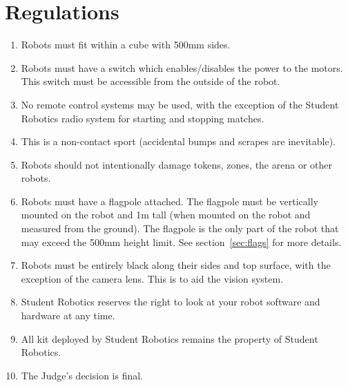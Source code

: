 \section {Regulations}
\label{regs}

\begin{enumerate}
\item Robots must fit within a cube with 500mm sides.
\item Robots must have a switch which enables/disables the power to the motors.  This switch must be accessible from the outside of the robot.
\item No remote control systems may be used, with the exception of the Student Robotics radio system for starting and stopping matches.
\item This is a non-contact sport (accidental bumps and scrapes are inevitable).
\item Robots should not intentionally damage tokens, zones, the arena or other robots.

\item Robots must have a flagpole attached.  The flagpole must be vertically mounted on the robot and 1m tall (when mounted on the robot and measured from the ground).  The flagpole is the only part of the robot that may exceed the 500mm height limit.  See section~\ref{sec:flags} for more details.

\item Robots must be entirely black along their sides and top surface, with the exception of the camera lens.  This is to aid the vision system.

\item Student Robotics reserves the right to look at your robot software and hardware at any time.
\item All kit deployed by Student Robotics remains the property of Student Robotics.
\item The Judge's decision is final.
\end{enumerate}
